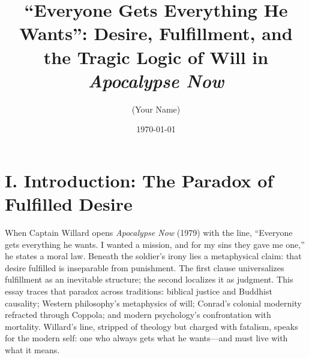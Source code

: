 \documentclass[12pt]{article}
\title{“Everyone Gets Everything He Wants”: Desire, Fulfillment, and the Tragic Logic of Will in \textit{Apocalypse Now}}
\author{(Your Name)}
\date{\today}
\begin{document}
\maketitle

\section*{I. Introduction: The Paradox of Fulfilled Desire}
When Captain Willard opens \textit{Apocalypse Now} (1979) with the line, ``Everyone gets everything he wants. I wanted a mission, and for my sins they gave me one,'' he states a moral law. Beneath the soldier’s irony lies a metaphysical claim: that desire fulfilled is inseparable from punishment. The first clause universalizes fulfillment as an inevitable structure; the second localizes it as judgment. This essay traces that paradox across traditions: biblical justice and Buddhist causality; Western philosophy’s metaphysics of will; Conrad’s colonial modernity refracted through Coppola; and modern psychology’s confrontation with mortality. Willard’s line, stripped of theology but charged with fatalism, speaks for the modern self: one who always gets what he wants—and must live with what it means.

\printbibliography
\end{document}

